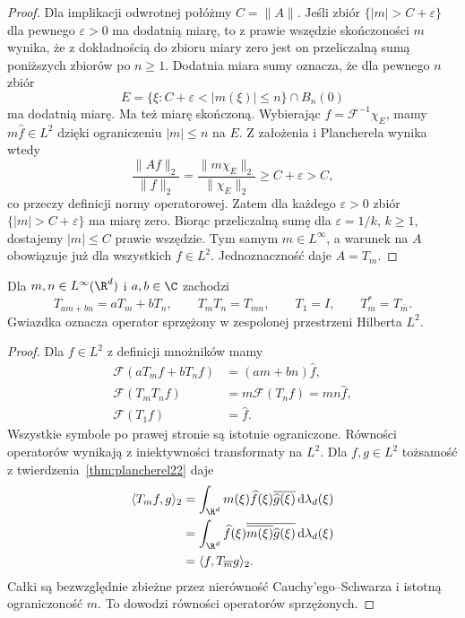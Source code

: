 \begin{proof}
Dla implikacji odwrotnej połóżmy $C=\|A\|$.
Jeśli zbiór $\{|m|>C+\varepsilon\}$ dla pewnego
$\varepsilon>0$ ma dodatnią miarę, to z
prawie wszędzie skończoności $m$ wynika, że
z dokładnością do zbioru miary zero jest on
przeliczalną sumą poniższych zbiorów po $n\ge1$.
Dodatnia miara sumy oznacza, że dla pewnego $n$ zbiór
\[
 E=\{\xi:C+\varepsilon<|m(\xi)|\le n\}
       \cap B_n(0)
\]
ma dodatnią miarę. Ma też miarę skończoną.
Wybierając $f=\mathcal F^{-1}\chi_E$,
mamy $m\widehat f\in L^2$ dzięki ograniczeniu
$|m|\le n$ na $E$. Z założenia i Plancherela
wynika wtedy
\[
 \frac{\|Af\|_2}{\|f\|_2}
 =\frac{\|m\chi_E\|_2}{\|\chi_E\|_2}
 \ge C+\varepsilon>C,
\]
co przeczy definicji normy operatorowej.
Zatem dla każdego $\varepsilon>0$ zbiór
$\{|m|>C+\varepsilon\}$ ma miarę zero.
Biorąc przeliczalną sumę dla
$\varepsilon=1/k$, $k\ge1$, dostajemy
$|m|\le C$ prawie wszędzie. Tym samym
$m\in L^\infty$, a warunek na $A$ obowiązuje
już dla wszystkich $f\in L^2$.
Jednoznaczność daje $A=T_m$.
\end{proof}

\begin{wniosek}
Dla $m,n\in L^\infty(\R^d)$ i $a,b\in\C$ zachodzi
\[
 T_{am+bn}=aT_m+bT_n,\qquad
 T_mT_n=T_{mn},\qquad T_1=I,\qquad
 T_m^*=T_{\overline m}.
\]
Gwiazdka oznacza operator sprzężony w zespolonej
przestrzeni Hilberta $L^2$.
\end{wniosek}
\begin{proof}
Dla $f\in L^2$ z definicji mnożników mamy
\[
 \begin{aligned}
 \mathcal F(aT_mf+bT_nf)&=(am+bn)\widehat f,\\
 \mathcal F(T_mT_nf)&=m\mathcal F(T_nf)=mn\widehat f,\\
 \mathcal F(T_1f)&=\widehat f.
 \end{aligned}
\]
Wszystkie symbole po prawej stronie są istotnie
ograniczone. Równości operatorów wynikają
z iniektywności transformaty na $L^2$.
Dla $f,g\in L^2$ tożsamość
 z twierdzenia~\ref{thm:plancherel22} daje
\[
 \begin{aligned}
 \langle T_m f,g\rangle_2
 &=\int_{\R^d}m(\xi)\widehat f(\xi)
       \overline{\widehat g(\xi)}\,\mathrm d\lambda_d(\xi)\\
 &=\int_{\R^d}\widehat f(\xi)
       \overline{\overline{m(\xi)}\widehat g(\xi)}
       \,\mathrm d\lambda_d(\xi)\\
 &=\langle f,T_{\overline m}g\rangle_2.
 \end{aligned}
\]
Całki są bezwzględnie zbieżne przez nierówność
Cauchy'ego--Schwarza i istotną ograniczoność $m$.
To dowodzi równości operatorów sprzężonych.
\end{proof}

